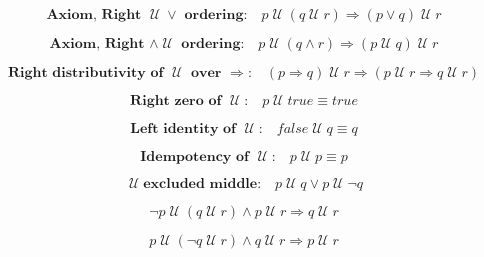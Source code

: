 \documentclass[12pt, fleqn, leqno]{article}
\newcommand{\impl}{\ensuremath{\Rightarrow}}        %
\newcommand{\Until}{\;\mathcal{U}\;}
\newcommand{\spacer}{\vspace{-30pt}}
\begin{document}
\spacer

\begin{equation}\label{E:leftAssocUntil}
\textbf{Axiom, Right $\Until \lor$ ordering:}\quad p \Until (q \Until r) \impl (p\lor q) \Until r
\end{equation}

\spacer

\begin{equation}\label{E:rightAssocUntil}
\textbf{Axiom, Right $\land \Until$ ordering:}\quad p \Until (q\land r) \impl (p \Until q) \Until r
\end{equation}

\spacer

\begin{equation}\label{E:rightUntilImplDist}
\textbf{Right distributivity of $\Until$ over $\impl$:}\quad (p \impl q) \Until r\impl (p \Until r \impl q \Until r)
\end{equation}

\spacer

\begin{equation}\label{E:zeroUntil}
\textbf{Right zero of $\Until$:}\quad p \Until true \equiv true
\end{equation}

\spacer

\begin{equation}\label{E:leftIdUntil}
\textbf{Left identity of $\Until$:}\quad false \Until q \equiv q
\end{equation}

\spacer

\begin{equation}\label{E:idemUntil}
\textbf{Idempotency of $\Until$:}\quad p \Until p \equiv p
\end{equation}

\spacer

\begin{equation}\label{E:untilExcludedMiddle}
\Until \textbf{excluded middle:}\quad p \Until q \lor p\Until \neg q
\end{equation}

\spacer

\begin{equation}\label{E:notPUntilQUntilR}
\neg p \Until (q \Until r) \land p\Until r \impl q\Until r
\end{equation}

\spacer


\begin{equation}\label{E:PUntilNotQUntilR}
p \Until (\neg q \Until r) \land q\Until r \impl p\Until r
\end{equation}
\end{document}
